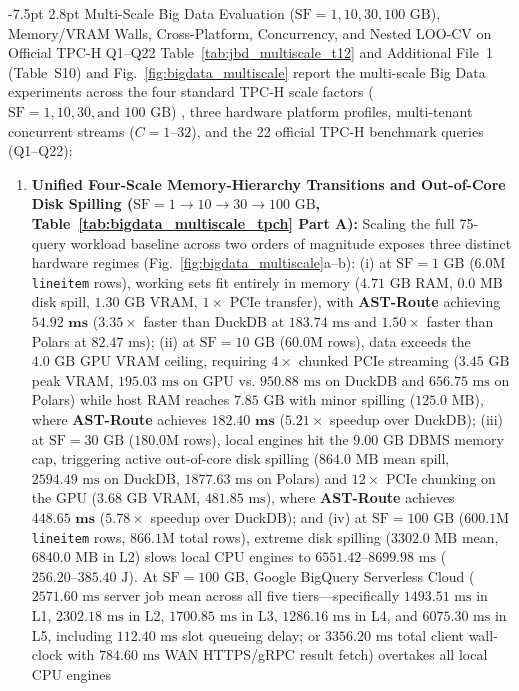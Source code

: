\documentclass[10pt,a4paper]{article}
\makeatletter
\renewcommand\subsection{\@startsection{subsection}{2}{\z@}%
  {-7.5pt \@plus -2pt \@minus -1pt}%
  {2.8pt \@plus 1pt}%
  {\normalfont\normalsize\bfseries}}
\makeatother
\begin{document}
\subsection{Multi-Scale Big Data Evaluation ($\text{SF}=1, 10, 30, 100\text{ GB}$), Memory/VRAM Walls, Cross-Platform, Concurrency, and Nested LOO-CV on Official TPC-H Q1--Q22}
Table~\ref{tab:jbd_multiscale_t12} and Additional File~1 (Table~S10) and Fig.~\ref{fig:bigdata_multiscale} report the multi-scale Big Data experiments across the four standard TPC-H scale factors ($\text{SF}=1, 10, 30, \text{and } 100\text{ GB}$) \cite{tpc2022tpch, dreseler2020quantifying}, three hardware platform profiles, multi-tenant concurrent streams ($C=1\text{--}32$), and the 22 official TPC-H benchmark queries (Q1--Q22):
\begin{enumerate}[leftmargin=1.5em,itemsep=0.8pt]
    \item \textbf{Unified Four-Scale Memory-Hierarchy Transitions and Out-of-Core Disk Spilling ($\text{SF}=1 \rightarrow 10 \rightarrow 30 \rightarrow 100\text{ GB}$, Table~\ref{tab:bigdata_multiscale_tpch} Part A):} Scaling the full 75-query workload baseline across two orders of magnitude exposes three distinct hardware regimes (Fig.~\ref{fig:bigdata_multiscale}a--b): (i) at $\text{SF}=1\text{ GB}$ ($6.0\text{M}$ \texttt{lineitem} rows), working sets fit entirely in memory ($4.71\text{ GB}$ RAM, $0.0\text{ MB}$ disk spill, $1.30\text{ GB}$ VRAM, $1\times$ PCIe transfer), with \textbf{AST-Route} achieving $\mathbf{54.92\text{ ms}}$ ($3.35\times$ faster than DuckDB at $183.74\text{ ms}$ and $1.50\times$ faster than Polars at $82.47\text{ ms}$); (ii) at $\text{SF}=10\text{ GB}$ ($60.0\text{M}$ rows), data exceeds the $4.0\text{ GB}$ GPU VRAM ceiling, requiring $4\times$ chunked PCIe streaming ($3.45\text{ GB}$ peak VRAM, $195.03\text{ ms}$ on GPU vs. $950.88\text{ ms}$ on DuckDB and $656.75\text{ ms}$ on Polars) while host RAM reaches $7.85\text{ GB}$ with minor spilling ($125.0\text{ MB}$), where \textbf{AST-Route} achieves $\mathbf{182.40\text{ ms}}$ ($\mathbf{5.21\times}$ speedup over DuckDB); (iii) at $\text{SF}=30\text{ GB}$ ($180.0\text{M}$ rows), local engines hit the $9.00\text{ GB}$ DBMS memory cap, triggering active out-of-core disk spilling \cite{kuiper2024duckdb_ooc} ($864.0\text{ MB}$ mean spill, $2594.49\text{ ms}$ on DuckDB, $1877.63\text{ ms}$ on Polars) and $12\times$ PCIe chunking on the GPU ($3.68\text{ GB}$ VRAM, $481.85\text{ ms}$), where \textbf{AST-Route} achieves $\mathbf{448.65\text{ ms}}$ ($\mathbf{5.78\times}$ speedup over DuckDB); and (iv) at $\text{SF}=100\text{ GB}$ ($600.1\text{M}$ \texttt{lineitem} rows, $866.1\text{M}$ total rows), extreme disk spilling ($3302.0\text{ MB}$ mean, $6840.0\text{ MB}$ in L2) slows local CPU engines to $6551.42\text{--}8699.98\text{ ms}$ ($256.20\text{--}385.40\text{ J}$). At $\text{SF}=100\text{ GB}$, Google BigQuery Serverless Cloud ($2571.60\text{ ms}$ server job mean across all five tiers---specifically $1493.51\text{ ms}$ in L1, $2302.18\text{ ms}$ in L2, $1700.85\text{ ms}$ in L3, $1286.16\text{ ms}$ in L4, and $6075.30\text{ ms}$ in L5, including $112.40\text{ ms}$ slot queueing delay; or $3356.20\text{ ms}$ total client wall-clock with $784.60\text{ ms}$ WAN HTTPS/gRPC result fetch) overtakes all local CPU engines 
\end{enumerate}
\end{document}
